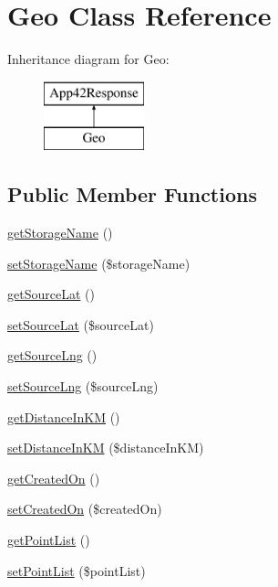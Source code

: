 \hypertarget{class_geo}{\section{Geo Class Reference}
\label{class_geo}
}
Inheritance diagram for Geo\+:\begin{figure}[H]
\begin{center}
\leavevmode
\includegraphics[height=2.000000cm]{class_geo}
\end{center}
\end{figure}
\subsection*{Public Member Functions}
\begin{DoxyCompactItemize}
\item 
\hyperlink{class_geo_aeb45a0cbaff9c4c32f516dd2812bbb9f}{get\+Storage\+Name} ()
\item 
\hyperlink{class_geo_a1c403cf444cf528a4bb7ac38fd8e2dd1}{set\+Storage\+Name} (\$storage\+Name)
\item 
\hyperlink{class_geo_a7833b38b1d7480a69b174578831a8412}{get\+Source\+Lat} ()
\item 
\hyperlink{class_geo_a56ce40131c8d31babee70d27cf2d4723}{set\+Source\+Lat} (\$source\+Lat)
\item 
\hyperlink{class_geo_a7f0de2693026951865025f895fdf9e2d}{get\+Source\+Lng} ()
\item 
\hyperlink{class_geo_ac6a278f533888ceb3b23b92d4e65f242}{set\+Source\+Lng} (\$source\+Lng)
\item 
\hyperlink{class_geo_a65c73001effb32eab7206f5b7f284415}{get\+Distance\+In\+K\+M} ()
\item 
\hyperlink{class_geo_a739826da6c788998394240d63e6a4551}{set\+Distance\+In\+K\+M} (\$distance\+In\+K\+M)
\item 
\hyperlink{class_geo_a346b90b05b25684ab3d2c62566270551}{get\+Created\+On} ()
\item 
\hyperlink{class_geo_adff89ef96f7c1e0f0752caca8ccc750b}{set\+Created\+On} (\$created\+On)
\item 
\hyperlink{class_geo_a9b905d155a05da7fd046069129b2bbf5}{get\+Point\+List} ()
\item 
\hyperlink{class_geo_aad5e0e32c36ebd6e6ec8bd9720abc5f3}{set\+Point\+List} (\$point\+List)
\end{DoxyCompactItemize}

